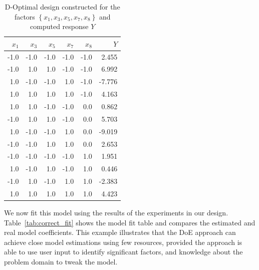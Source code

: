 \documentclass[conference]{IEEEtran}
\begin{document}
\begin{table}[t]
\centering
\caption{D-Optimal design constructed for the factors $\left\{x_1,x_3,x_5,x_7,x_8\right\}$ and computed response $Y$}
\label{tab:d_optimal}
\begingroup\footnotesize
\begin{tabular}{rrrrrr}
  \toprule
$x_1$ & $x_3$ & $x_5$ & $x_7$ & $x_8$ & $Y$ \\
  \midrule
-1.0 & -1.0 & -1.0 & -1.0 & -1.0 & 2.455 \\
  -1.0 & 1.0 & 1.0 & -1.0 & -1.0 & 6.992 \\
  1.0 & -1.0 & -1.0 & 1.0 & -1.0 & -7.776 \\
  1.0 & 1.0 & 1.0 & 1.0 & -1.0 & 4.163 \\
  1.0 & 1.0 & -1.0 & -1.0 & 0.0 & 0.862 \\
  -1.0 & 1.0 & 1.0 & -1.0 & 0.0 & 5.703 \\
  1.0 & -1.0 & -1.0 & 1.0 & 0.0 & -9.019 \\
  -1.0 & -1.0 & 1.0 & 1.0 & 0.0 & 2.653 \\
  -1.0 & -1.0 & -1.0 & -1.0 & 1.0 & 1.951 \\
  1.0 & -1.0 & 1.0 & -1.0 & 1.0 & 0.446 \\
  -1.0 & 1.0 & -1.0 & 1.0 & 1.0 & -2.383 \\
  1.0 & 1.0 & 1.0 & 1.0 & 1.0 & 4.423 \\
   \bottomrule
\end{tabular}
\endgroup
\end{table}

We now fit this model using the results of the experiments in our design.
Table~\ref{tab:correct_fit} shows the model fit table and compares the
estimated and real model coefficients. This example illustrates that the DoE
approach can achieve close model estimations using few resources, provided the
approach is able to use user input to identify significant factors, and
knowledge about the problem domain to tweak the model.
\end{document}

